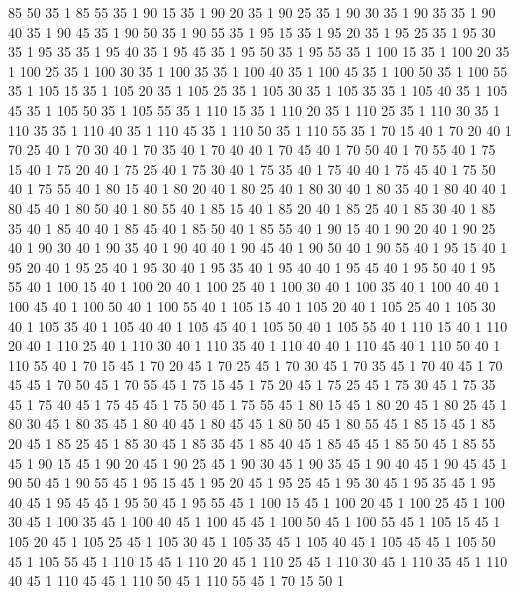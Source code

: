 	85	50	35	1
	85	55	35	1
	90	15	35	1
	90	20	35	1
	90	25	35	1
	90	30	35	1
	90	35	35	1
	90	40	35	1
	90	45	35	1
	90	50	35	1
	90	55	35	1
	95	15	35	1
	95	20	35	1
	95	25	35	1
	95	30	35	1
	95	35	35	1
	95	40	35	1
	95	45	35	1
	95	50	35	1
	95	55	35	1
	100	15	35	1
	100	20	35	1
	100	25	35	1
	100	30	35	1
	100	35	35	1
	100	40	35	1
	100	45	35	1
	100	50	35	1
	100	55	35	1
	105	15	35	1
	105	20	35	1
	105	25	35	1
	105	30	35	1
	105	35	35	1
	105	40	35	1
	105	45	35	1
	105	50	35	1
	105	55	35	1
	110	15	35	1
	110	20	35	1
	110	25	35	1
	110	30	35	1
	110	35	35	1
	110	40	35	1
	110	45	35	1
	110	50	35	1
	110	55	35	1
	70	15	40	1
	70	20	40	1
	70	25	40	1
	70	30	40	1
	70	35	40	1
	70	40	40	1
	70	45	40	1
	70	50	40	1
	70	55	40	1
	75	15	40	1
	75	20	40	1
	75	25	40	1
	75	30	40	1
	75	35	40	1
	75	40	40	1
	75	45	40	1
	75	50	40	1
	75	55	40	1
	80	15	40	1
	80	20	40	1
	80	25	40	1
	80	30	40	1
	80	35	40	1
	80	40	40	1
	80	45	40	1
	80	50	40	1
	80	55	40	1
	85	15	40	1
	85	20	40	1
	85	25	40	1
	85	30	40	1
	85	35	40	1
	85	40	40	1
	85	45	40	1
	85	50	40	1
	85	55	40	1
	90	15	40	1
	90	20	40	1
	90	25	40	1
	90	30	40	1
	90	35	40	1
	90	40	40	1
	90	45	40	1
	90	50	40	1
	90	55	40	1
	95	15	40	1
	95	20	40	1
	95	25	40	1
	95	30	40	1
	95	35	40	1
	95	40	40	1
	95	45	40	1
	95	50	40	1
	95	55	40	1
	100	15	40	1
	100	20	40	1
	100	25	40	1
	100	30	40	1
	100	35	40	1
	100	40	40	1
	100	45	40	1
	100	50	40	1
	100	55	40	1
	105	15	40	1
	105	20	40	1
	105	25	40	1
	105	30	40	1
	105	35	40	1
	105	40	40	1
	105	45	40	1
	105	50	40	1
	105	55	40	1
	110	15	40	1
	110	20	40	1
	110	25	40	1
	110	30	40	1
	110	35	40	1
	110	40	40	1
	110	45	40	1
	110	50	40	1
	110	55	40	1
	70	15	45	1
	70	20	45	1
	70	25	45	1
	70	30	45	1
	70	35	45	1
	70	40	45	1
	70	45	45	1
	70	50	45	1
	70	55	45	1
	75	15	45	1
	75	20	45	1
	75	25	45	1
	75	30	45	1
	75	35	45	1
	75	40	45	1
	75	45	45	1
	75	50	45	1
	75	55	45	1
	80	15	45	1
	80	20	45	1
	80	25	45	1
	80	30	45	1
	80	35	45	1
	80	40	45	1
	80	45	45	1
	80	50	45	1
	80	55	45	1
	85	15	45	1
	85	20	45	1
	85	25	45	1
	85	30	45	1
	85	35	45	1
	85	40	45	1
	85	45	45	1
	85	50	45	1
	85	55	45	1
	90	15	45	1
	90	20	45	1
	90	25	45	1
	90	30	45	1
	90	35	45	1
	90	40	45	1
	90	45	45	1
	90	50	45	1
	90	55	45	1
	95	15	45	1
	95	20	45	1
	95	25	45	1
	95	30	45	1
	95	35	45	1
	95	40	45	1
	95	45	45	1
	95	50	45	1
	95	55	45	1
	100	15	45	1
	100	20	45	1
	100	25	45	1
	100	30	45	1
	100	35	45	1
	100	40	45	1
	100	45	45	1
	100	50	45	1
	100	55	45	1
	105	15	45	1
	105	20	45	1
	105	25	45	1
	105	30	45	1
	105	35	45	1
	105	40	45	1
	105	45	45	1
	105	50	45	1
	105	55	45	1
	110	15	45	1
	110	20	45	1
	110	25	45	1
	110	30	45	1
	110	35	45	1
	110	40	45	1
	110	45	45	1
	110	50	45	1
	110	55	45	1
	70	15	50	1
